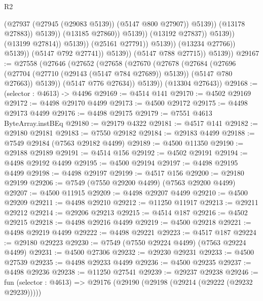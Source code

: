 \begin{lexlean}{R2}
\begin{coremodule}
                                                        (@27937
                                                          (@27945 (@29083 @5139))
                                                          (@5147 @800 @27907))
                                                        @5139))
                                                    (@13178 @27883))
                                                  @5139))
                                              (@13185 @27860))
                                            @5139))
                                        (@13192 @27837))
                                      @5139))
                                  (@13199 @27814))
                                @5139))
                            (@25161 @27791))
                          @5139))
                      (@13234 @27766))
                    @5139))
                (@5147 @792 @27741))
              @5139))
          (@5147 @788 @27715))
        @5139))
@29167 := @27558
    (@27646
      (@27652
        (@27658
          (@27670
            (@27678
              (@27684
                (@27696 (@27704 (@27710 (@29143 (@5147 @784 @27689)) @5139)) (@5147 @780 @27663))
                @5139))
            (@5147 @776 @27634))
          @5139))
      (@13304 @27643))
@29168 := (selector : @4613) -> @4496
@29169 := @4514 @141
@29170 := @4502 @29169
@29172 := @4498 @29170 @4499
@29173 := @4500 @29172
@29175 := @4498 @29173 @4499
@29176 := @4498 @29175
@29179 := @7551 @4613 ByteArray.instBEq
@29180 := @29179 @4322
@29181 := @4517 @141
@29182 := @29180 @29181
@29183 := @7550 @29182
@29184 := @29183 @4499
@29188 := @7549 @29184 (@7563 @29182 @4499)
@29189 := @4500 @11350
@29190 := @29188 @29189
@29191 := @4514 @156
@29192 := @4502 @29191
@29194 := @4498 @29192 @4499
@29195 := @4500 @29194
@29197 := @4498 @29195 @4499
@29198 := @4498 @29197
@29199 := @4517 @156
@29200 := @29180 @29199
@29206 := @7549 (@7550 @29200 @4499) (@7563 @29200 @4499)
@29207 := @4500 @11915
@29209 := @4498 @29207 @4499
@29210 := @4500 @29209
@29211 := @4498 @29210
@29212 := @11250 @11917
@29213 := @29211 @29212
@29214 := @29206 @29213
@29215 := @4514 @187
@29216 := @4502 @29215
@29218 := @4498 @29216 @4499
@29219 := @4500 @29218
@29221 := @4498 @29219 @4499
@29222 := @4498 @29221
@29223 := @4517 @187
@29224 := @29180 @29223
@29230 := @7549 (@7550 @29224 @4499) (@7563 @29224 @4499)
@29231 := @4500 @27306
@29232 := @29230 @29231
@29233 := @4500 @27539
@29235 := @4498 @29233 @4499
@29236 := @4500 @29235
@29237 := @4498 @29236
@29238 := @11250 @27541
@29239 := @29237 @29238
@29246 := fun (selector : @4613) => @29176 (@29190 (@29198 (@29214 (@29222 (@29232 @29239)))))

\end{coremodule}
\end{lexlean}
